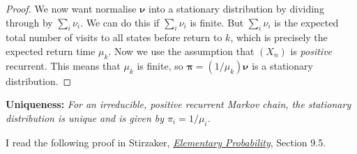 \documentclass[
  a4paper,
]{article}
\theoremstyle{definition}
\theoremstyle{definition}
\theoremstyle{definition}
\theoremstyle{remark}
\begin{document}
\begin{proof}
We now want normalise \(\boldsymbol\nu\) into a stationary distribution by dividing through by \(\sum_i \nu_i\). We can do this if \(\sum_i \nu_i\) is finite. But \(\sum_i \nu_i\) is the expected total number of visits to all states before return to \(k\), which is precisely the expected return time \(\mu_k\). Now we use the assumption that \((X_n)\) is \emph{positive} recurrent. This means that \(\mu_k\) is finite, so \(\boldsymbol\pi = (1/\mu_k) \boldsymbol\nu\) is a stationary distribution.

\end{proof}

\textbf{Uniqueness:} \emph{For an irreducible, positive recurrent Markov chain, the stationary distribution is unique and is given by \(\pi_i = 1/\mu_i\).}

I read the following proof in Stirzaker, \href{https://leeds.primo.exlibrisgroup.com/permalink/44LEE_INST/13rlbcs/alma991013131349705181}{\emph{Elementary Probability}}, Section 9.5.
\end{document}
